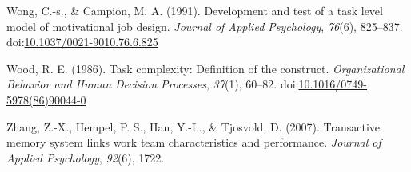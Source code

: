 \documentclass[english,,man]{apa6}
\theoremstyle{definition}
\theoremstyle{definition}
\theoremstyle{definition}
\theoremstyle{remark}
\begin{document}
\leavevmode\hypertarget{ref-wong_development_1991}{}%
Wong, C.-s., \& Campion, M. A. (1991). Development and test of a task
level model of motivational job design. \emph{Journal of Applied
Psychology}, \emph{76}(6), 825--837.
doi:\href{https://doi.org/10.1037/0021-9010.76.6.825}{10.1037/0021-9010.76.6.825}

\leavevmode\hypertarget{ref-wood_task_1986}{}%
Wood, R. E. (1986). Task complexity: Definition of the construct.
\emph{Organizational Behavior and Human Decision Processes},
\emph{37}(1), 60--82.
doi:\href{https://doi.org/10.1016/0749-5978(86)90044-0}{10.1016/0749-5978(86)90044-0}

\leavevmode\hypertarget{ref-zhang2007transactive}{}%
Zhang, Z.-X., Hempel, P. S., Han, Y.-L., \& Tjosvold, D. (2007).
Transactive memory system links work team characteristics and
performance. \emph{Journal of Applied Psychology}, \emph{92}(6), 1722.
\end{document}

